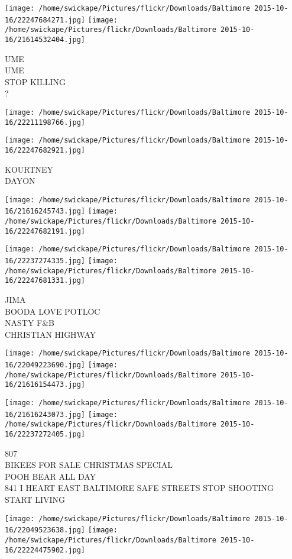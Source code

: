 \documentclass[10pt,letterpaper]{article}
\begin{document}
\texttt{[image: /home/swickape/Pictures/flickr/Downloads/Baltimore 2015-10-16/22247684271.jpg]}
\texttt{[image: /home/swickape/Pictures/flickr/Downloads/Baltimore 2015-10-16/21614532404.jpg]}

UME\\
UME\\
STOP KILLING\\
?
\pagebreak

\texttt{[image: /home/swickape/Pictures/flickr/Downloads/Baltimore 2015-10-16/22211198766.jpg]}

\vspace{0.25in}
\texttt{[image: /home/swickape/Pictures/flickr/Downloads/Baltimore 2015-10-16/22247682921.jpg]}

KOURTNEY\\
DAYON
\pagebreak

\texttt{[image: /home/swickape/Pictures/flickr/Downloads/Baltimore 2015-10-16/21616245743.jpg]}
\texttt{[image: /home/swickape/Pictures/flickr/Downloads/Baltimore 2015-10-16/22247682191.jpg]}

\texttt{[image: /home/swickape/Pictures/flickr/Downloads/Baltimore 2015-10-16/22237274335.jpg]}
\texttt{[image: /home/swickape/Pictures/flickr/Downloads/Baltimore 2015-10-16/22247681331.jpg]}

JIMA\\
BOODA LOVE POTLOC\\
NASTY F\&B\\
CHRISTIAN HIGHWAY
\pagebreak

\texttt{[image: /home/swickape/Pictures/flickr/Downloads/Baltimore 2015-10-16/22049223690.jpg]}
\texttt{[image: /home/swickape/Pictures/flickr/Downloads/Baltimore 2015-10-16/21616154473.jpg]}

\texttt{[image: /home/swickape/Pictures/flickr/Downloads/Baltimore 2015-10-16/21616243073.jpg]}
\texttt{[image: /home/swickape/Pictures/flickr/Downloads/Baltimore 2015-10-16/22237272405.jpg]}

807\\
BIKEES FOR SALE CHRISTMAS SPECIAL\\
POOH BEAR ALL DAY\\
841 I HEART EAST BALTIMORE SAFE STREETS STOP SHOOTING START LIVING
\pagebreak

\texttt{[image: /home/swickape/Pictures/flickr/Downloads/Baltimore 2015-10-16/22049523638.jpg]}
\texttt{[image: /home/swickape/Pictures/flickr/Downloads/Baltimore 2015-10-16/22224475902.jpg]}
\end{document}
